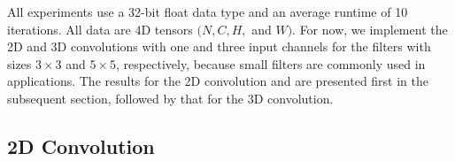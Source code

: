 All experiments use a 32-bit float data type and an average runtime of 10 iterations. All data are 4D tensors $(N,C,H,$ and $W)$. For
now, we implement the 2D and 3D convolutions with one and three input channels for the filters with sizes $3 \times 3$ and $5 \times 5$, respectively, because small filters are commonly used in applications. The results for the 2D convolution and are presented first in the subsequent section, followed by that for the 3D convolution.

\subsection{2D Convolution}
